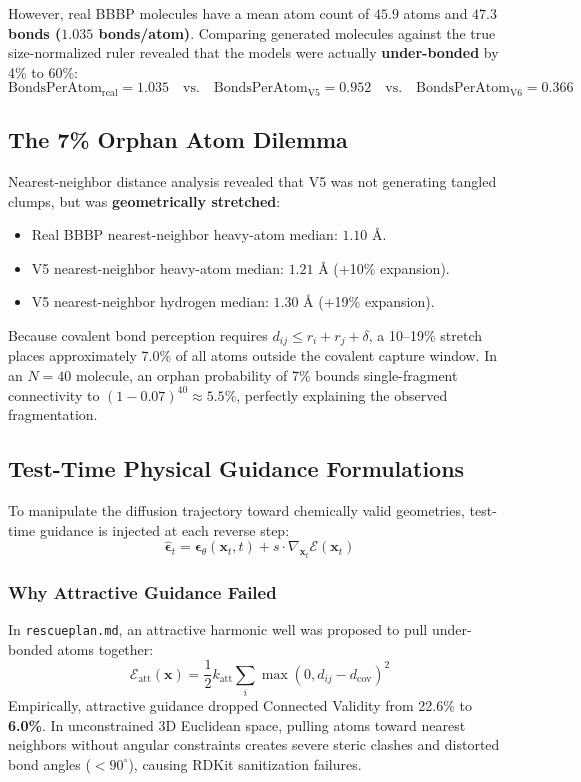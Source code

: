 \documentclass[11pt, a4paper]{article}
\begin{document}
However, real BBBP molecules have a mean atom count of $45.9$ atoms and \textbf{$47.3$ bonds ($1.035$ bonds/atom)}. Comparing generated molecules against the true size-normalized ruler revealed that the models were actually \textbf{under-bonded} by 4\% to 60\%:
\begin{equation}
\text{BondsPerAtom}_{\text{real}} = 1.035 \quad \text{vs.} \quad \text{BondsPerAtom}_{\text{V5}} = 0.952 \quad \text{vs.} \quad \text{BondsPerAtom}_{\text{V6}} = 0.366
\end{equation}

\subsection{The 7\% Orphan Atom Dilemma}
Nearest-neighbor distance analysis revealed that V5 was not generating tangled clumps, but was \textbf{geometrically stretched}:
\begin{itemize}[noitemsep]
    \item Real BBBP nearest-neighbor heavy-atom median: $1.10\text{ \AA}$.
    \item V5 nearest-neighbor heavy-atom median: $1.21\text{ \AA}$ (+10\% expansion).
    \item V5 nearest-neighbor hydrogen median: $1.30\text{ \AA}$ (+19\% expansion).
\end{itemize}
Because covalent bond perception requires $d_{ij} \le r_i + r_j + \delta$, a 10--19\% stretch places approximately 7.0\% of all atoms outside the covalent capture window. In an $N=40$ molecule, an orphan probability of 7\% bounds single-fragment connectivity to $(1 - 0.07)^{40} \approx 5.5\%$, perfectly explaining the observed fragmentation.

\subsection{Test-Time Physical Guidance Formulations}
To manipulate the diffusion trajectory toward chemically valid geometries, test-time guidance is injected at each reverse step:
\begin{equation}
\hat{\bm{\epsilon}}_t = \bm{\epsilon}_\theta(\bm{x}_t, t) + s \cdot \nabla_{\bm{x}_t} \mathcal{E}(\bm{x}_t)
\end{equation}

\subsubsection{Why Attractive Guidance Failed}
In \texttt{rescueplan.md}, an attractive harmonic well was proposed to pull under-bonded atoms together:
\begin{equation}
\mathcal{E}_{\text{att}}(\bm{x}) = \frac{1}{2} k_{\text{att}} \sum_{i} \max\left(0, d_{ij} - d_{\text{cov}}\right)^2
\end{equation}
Empirically, attractive guidance dropped Connected Validity from 22.6\% to \textbf{6.0\%}. In unconstrained 3D Euclidean space, pulling atoms toward nearest neighbors without angular constraints creates severe steric clashes and distorted bond angles ($<90^\circ$), causing RDKit sanitization failures.
\end{document}
